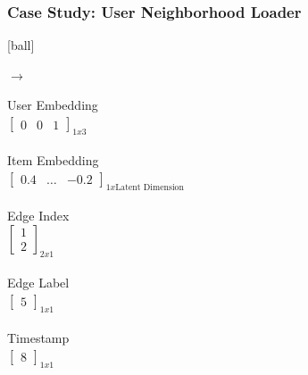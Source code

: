 \documentclass{beamer}
\begin{document}
\begin{frame}[fragile]
\frametitle{Case Study: User Neighborhood Loader}
[ball]

\begin{minipage}[c]{0.3\textwidth}
    \hspace{1cm}
    
\end{minipage}
\hfill
\begin{minipage}[c]{0.1\textwidth}
    \hspace{1cm}
    $\to$
\end{minipage}
\hfill
\begin{minipage}[c]{0.5\textwidth}
    User Embedding \\ 
    $\begin{bmatrix}
    0 & 0 & 1 
    \end{bmatrix}_{1x3}$ \\~\\
    Item Embedding \\ 
    $\begin{bmatrix}
    0.4 & \ldots & -0.2
    \end{bmatrix}_{1x \text{Latent Dimension}}$ \\~\\
    Edge Index \\
    $\begin{bmatrix}
    1 \\
    2
    \end{bmatrix}_{2x1}$ \\~\\
    Edge Label \\ 
    $\begin{bmatrix}
    5 
    \end{bmatrix}_{1x1}$ \\~\\
    Timestamp \\ 
    $\begin{bmatrix}
    8 
    \end{bmatrix}_{1x1}$
\end{minipage}
\end{frame}

\end{document}
